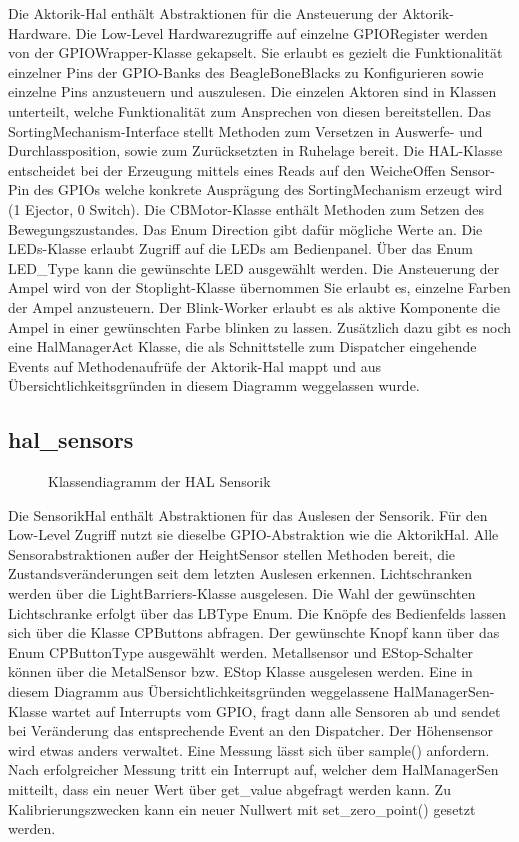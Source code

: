 Die Aktorik-Hal enthält Abstraktionen für die Ansteuerung der Aktorik-Hardware.
Die Low-Level Hardwarezugriffe auf einzelne GPIO\-Register werden von der GPIOWrapper-Klasse gekapselt.
Sie erlaubt es gezielt die Funktionalität einzelner Pins der GPIO-Banks des BeagleBoneBlacks zu
Konfigurieren sowie einzelne Pins anzusteuern und auszulesen. Die einzelen Aktoren sind in Klassen unterteilt, 
welche Funktionalität zum Ansprechen von diesen bereitstellen. 
Das SortingMechanism-Interface stellt Methoden zum Versetzen in Auswerfe- und Durchlassposition, 
sowie zum Zurücksetzten in Ruhelage bereit. Die HAL-Klasse entscheidet bei der Erzeugung mittels 
eines Reads auf den WeicheOffen Sensor-Pin des GPIOs welche konkrete Ausprägung des SortingMechanism erzeugt wird
(1 Ejector, 0 Switch).
Die CBMotor-Klasse enthält Methoden zum Setzen des Bewegungszustandes. Das Enum Direction gibt dafür mögliche Werte an.
Die LEDs-Klasse erlaubt Zugriff auf die LEDs am Bedienpanel. Über das Enum LED\_Type kann die gewünschte LED ausgewählt werden.
Die Ansteuerung der Ampel wird von der Stoplight-Klasse übernommen Sie erlaubt es, einzelne Farben der Ampel anzusteuern.
Der Blink-Worker erlaubt es als aktive Komponente die Ampel in einer gewünschten Farbe blinken zu lassen.
Zusätzlich dazu gibt es noch eine HalManagerAct Klasse, die als Schnittstelle zum Dispatcher eingehende Events auf Methodenaufrüfe der Aktorik-Hal 
mappt und aus Übersichtlichkeitsgründen in diesem Diagramm weggelassen wurde.

\subsection{hal\_sensors}\label{subsec:hal_sensors}

\begin{figure}
    \caption{Klassendiagramm der HAL Sensorik}
    \label{fig:cd-hal-sens}
\end{figure}

Die Sensorik\-Hal enthält Abstraktionen für das Auslesen der Sensorik. 
Für den Low-Level Zugriff nutzt sie dieselbe GPIO-Abstraktion wie die Aktorik\-Hal.
Alle Sensorabstraktionen außer der HeightSensor stellen Methoden bereit, die Zustandsveränderungen 
seit dem letzten Auslesen erkennen. 
Lichtschranken werden über die LightBarriers-Klasse ausgelesen. 
Die Wahl der gewünschten Lichtschranke erfolgt über das LBType Enum.
Die Knöpfe des Bedienfelds lassen sich über die Klasse CPButtons abfragen. 
Der gewünschte Knopf kann über das Enum CPButtonType ausgewählt werden.
Metallsensor und EStop-Schalter können über die MetalSensor bzw. EStop Klasse ausgelesen werden.
Eine in diesem Diagramm aus Übersichtlichkeitsgründen weggelassene HalManagerSen-Klasse wartet
auf Interrupts vom GPIO, fragt dann alle Sensoren ab und sendet bei Veränderung das entsprechende 
Event an den Dispatcher. 
Der Höhensensor wird etwas anders verwaltet. Eine Messung lässt sich über sample() anfordern. 
Nach erfolgreicher Messung tritt ein Interrupt auf, welcher dem HalManagerSen mitteilt,
dass ein neuer Wert über get\_value abgefragt werden kann.
Zu Kalibrierungszwecken kann ein neuer Nullwert mit set\_zero\_point() gesetzt werden.

